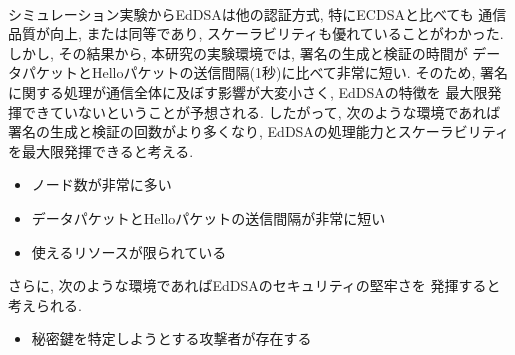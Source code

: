 \\
\indent シミュレーション実験からEdDSAは他の認証方式, 特にECDSAと比べても
通信品質が向上, または同等であり, スケーラビリティも優れていることがわかった. 
しかし, その結果から, 本研究の実験環境では, 署名の生成と検証の時間が
データパケットとHelloパケットの送信間隔(1秒)に比べて非常に短い. そのため,  
署名に関する処理が通信全体に及ぼす影響が大変小さく, EdDSAの特徴を
最大限発揮できていないということが予想される. 
したがって, 次のような環境であれば署名の生成と検証の回数がより多くなり, 
EdDSAの処理能力とスケーラビリティを最大限発揮できると考える. 
\begin{itemize}
  \item ノード数が非常に多い
  \item データパケットとHelloパケットの送信間隔が非常に短い
  \item 使えるリソースが限られている
\end{itemize}
さらに, 次のような環境であればEdDSAのセキュリティの堅牢さを
発揮すると考えられる. 
\begin{itemize}
  \item 秘密鍵を特定しようとする攻撃者が存在する
\end{itemize} 






